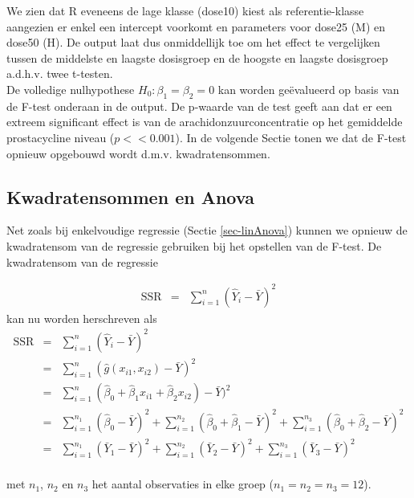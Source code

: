 \documentclass[
  dutch,
  letterpaper,
  12pt]{book}
\theoremstyle{definition}
\theoremstyle{definition}
\theoremstyle{definition}
\theoremstyle{remark}
\begin{document}
We zien dat R eveneens de lage klasse (dose10) kiest als
referentie-klasse aangezien er enkel een intercept voorkomt en
parameters voor dose25 (M) en dose50 (H). De output laat dus
onmiddellijk toe om het effect te vergelijken tussen de middelste en
laagste dosisgroep en de hoogste en laagste dosisgroep a.d.h.v. twee
t-testen.\\
De volledige nulhypothese \(H_0: \beta_1=\beta_2=0\) kan worden
geëvalueerd op basis van de F-test onderaan in de output. De p-waarde
van de test geeft aan dat er een extreem significant effect is van de
arachidonzuurconcentratie op het gemiddelde prostacycline niveau
(\(p<<0.001\)). In de volgende Sectie tonen we dat de F-test opnieuw
opgebouwd wordt d.m.v. kwadratensommen.

\subsection{Kwadratensommen en Anova}\label{kwadratensommen-en-anova}

Net zoals bij enkelvoudige regressie (Sectie \ref{sec-linAnova}) kunnen
we opnieuw de kwadratensom van de regressie gebruiken bij het opstellen
van de F-test. De kwadratensom van de regressie

\begin{eqnarray*}
\text{SSR}&=&\sum\limits_{i=1}^n (\hat Y_{i} -\bar Y)^2
\end{eqnarray*} kan nu worden herschreven als \begin{eqnarray*}
\text{SSR}&=&\sum\limits_{i=1}^n (\hat Y_i -\bar Y)^2\\
&=& \sum\limits_{i=1}^n (\hat{g} (x_{i1},x_{i2}) - \bar Y)^2\\
&=& \sum\limits_{i=1}^n (\hat\beta_0+\hat\beta_1x_{i1}+\hat\beta_2x_{i2}) - \bar Y)^2\\
&=& \sum\limits_{i=1}^{n_1} (\hat\beta_0 - \bar Y)^2 +\sum\limits_{i=1}^{n_2} (\hat\beta_0 + \hat\beta_1 - \bar Y)^2+\sum\limits_{i=1}^{n_3} (\hat\beta_0 + \hat\beta_2 - \bar Y)^2\\
&=& \sum\limits_{i=1}^{n_1} (\bar Y_1- \bar Y)^2 +\sum\limits_{i=1}^{n_2} (\bar Y_2- \bar Y)^2+\sum\limits_{i=1}^{n_3} (\bar Y_3 - \bar Y)^2\\
\end{eqnarray*}

met \(n_1\), \(n_2\) en \(n_3\) het aantal observaties in elke groep
(\(n_1=n_2=n_3=12\)).
\end{document}
